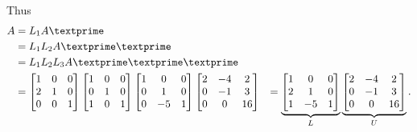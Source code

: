 \documentclass[12pt]{article}
\begin{document}
Thus
\begin{align*}
	A &= L_1 A\textprime \\
	  &= L_1 L_2 A\textprime\textprime \\
	  &= L_1 L_2 L_3 A\textprime\textprime\textprime \\
	  &=
	\begin{bmatrix}
	1 & 0 & 0 \\
	2 & 1 & 0 \\
	0 & 0 & 1 	
	\end{bmatrix}
	\begin{bmatrix}
	1 & 0 & 0 \\
	0 & 1 & 0 \\
	1 & 0 & 1 	
	\end{bmatrix}
	\begin{bmatrix}
	1 &  0 & 0 \\
	0 &  1 & 0 \\
	0 & -5 & 1 	
	\end{bmatrix}
	\begin{bmatrix}
	2 & -4 & 2 \\
	0 & -1 & 3 \\
	0 &  0 & 16	
	\end{bmatrix}%
	  &=
	  \underbrace{%
	  \begin{bmatrix}
	  1 & 0 & 0 \\
	  2 & 1 & 0 \\
	  1 & -5 & 1
	  \end{bmatrix}%
	  }_{L}
	  \underbrace{%
	\begin{bmatrix}
	2 & -4 & 2 \\
	0 & -1 & 3 \\
	0 &  0 & 16	
	\end{bmatrix}%
	}_{U}
	.
\end{align*}
			
\end{document}
